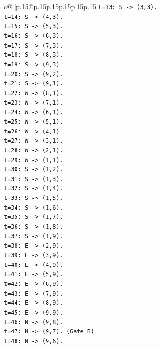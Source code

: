\documentclass{article}
\begin{document}
{\begin{supertabular}{c@{$\;$}|p{.15\linewidth}@{}p{.15\linewidth}p{.15\linewidth}p{.15\linewidth}p{.15\linewidth}p{.15\linewidth}}
{{{\texttt{t=13: S {-}> (3,3).} \\
\texttt{t=14: S {-}> (4,3).} \\
\texttt{t=15: S {-}> (5,3).} \\
\texttt{t=16: S {-}> (6,3).} \\
\texttt{t=17: S {-}> (7,3).} \\
\texttt{t=18: S {-}> (8,3).} \\
\texttt{t=19: S {-}> (9,3).} \\
\texttt{t=20: S {-}> (9,2).} \\
\texttt{t=21: S {-}> (9,1).} \\
\texttt{t=22: W {-}> (8,1).} \\
\texttt{t=23: W {-}> (7,1).} \\
\texttt{t=24: W {-}> (6,1).} \\
\texttt{t=25: W {-}> (5,1).} \\
\texttt{t=26: W {-}> (4,1).} \\
\texttt{t=27: W {-}> (3,1).} \\
\texttt{t=28: W {-}> (2,1).} \\
\texttt{t=29: W {-}> (1,1).} \\
\texttt{t=30: S {-}> (1,2).} \\
\texttt{t=31: S {-}> (1,3).} \\
\texttt{t=32: S {-}> (1,4).} \\
\texttt{t=33: S {-}> (1,5).} \\
\texttt{t=34: S {-}> (1,6).} \\
\texttt{t=35: S {-}> (1,7).} \\
\texttt{t=36: S {-}> (1,8).} \\
\texttt{t=37: S {-}> (1,9).} \\
\texttt{t=38: E {-}> (2,9).} \\
\texttt{t=39: E {-}> (3,9).} \\
\texttt{t=40: E {-}> (4,9).} \\
\texttt{t=41: E {-}> (5,9).} \\
\texttt{t=42: E {-}> (6,9).} \\
\texttt{t=43: E {-}> (7,9).} \\
\texttt{t=44: E {-}> (8,9).} \\
\texttt{t=45: E {-}> (9,9).} \\
\texttt{t=46: N {-}> (9,8).} \\
\texttt{t=47: N {-}> (9,7). (Gate B).} \\
\texttt{t=48: N {-}> (9,6).} \\
}}}
\end{supertabular}}
\end{document}
